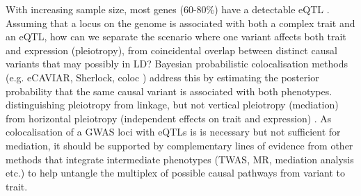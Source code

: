 \begin{outline}
\1 With increasing sample size, most genes (60-80\%) have a detectable eQTL \autocite{vandiedonck2017GeneticAssociationMolecular}.
Assuming that a locus on the genome is associated with both a complex trait and an \gls{eQTL},
how can we separate the scenario where one variant affects both trait and expression (pleiotropy),
from coincidental overlap between distinct causal variants that may possibly in \gls{LD}?
Bayesian probabilistic colocalisation methods (e.g. eCAVIAR, Sherlock, coloc \autocite{wallace2020ElicitingPriorsRelaxing}) 
address this by estimating the posterior probability that the same causal variant is associated with both phenotypes.
distinguishing pleiotropy from linkage, 
but not vertical pleiotropy (mediation) from horizontal pleiotropy (independent effects on trait and expression) \autocite{hemani2018EvaluatingPotentialRole}.
As colocalisation of a \gls{GWAS} loci with \glspl{eQTL} is is necessary but not sufficient for mediation, 
it should be supported by complementary lines of evidence from other methods that integrate intermediate phenotypes (TWAS, MR, mediation analysis etc.) \autocite{hemani2018EvaluatingPotentialRole}
to help untangle the multiplex of possible causal pathways from variant to trait.
%
%
%

\end{outline}
